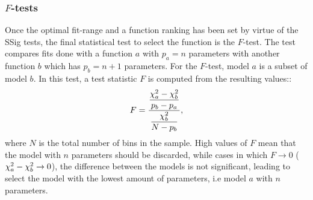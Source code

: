 


















\subsubsection{\(F\)-tests}
\label{subsubsec:bkg:modeling:preparation:ftest}

Once the optimal fit-range and a function ranking has been set by virtue of the \ac{SSig} tests, the final statistical test to select the function is the \(F\)-test. The test compares fits done with a function \(a\) with \(p_a = n\) parameters with another function \(b\) which has \(p_b = n+1\) parameters. For the \(F\)-test, model \(a\) is a subset of model \(b\). In this test, a test statistic \(F\) is computed from the resulting \chisq values::
\begin{equation}
    \label{eq:bkg:modeling:preparation:ftest:ftest}
    F = \frac{
        \displaystyle
        \frac{\chi^{2}_a - \chi^{2}_b}{p_b - p_a}
    }{
        \displaystyle
        \frac{\chi^{2}_b}{N - p_b}
    },
\end{equation}
where \(N\) is the total number of bins in the sample.
High values of \(F\) mean that the model with \(n\) parameters should be discarded, while cases in which \(F \to 0\) (\(\chi^{2}_a - \chi^{2}_b \rightarrow 0\)), the difference between the models is not significant, leading to select the model with the lowest amount of parameters, i.e model \(a\) with \(n\) parameters.



